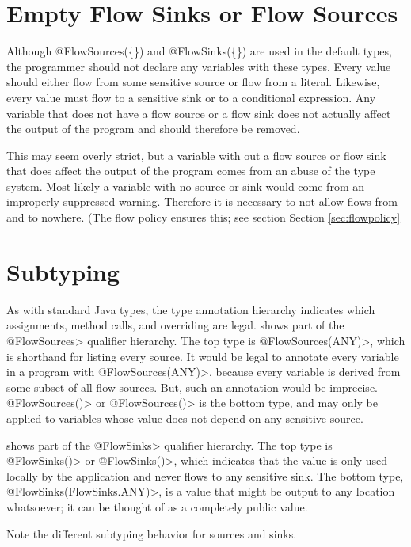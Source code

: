 \section{Empty Flow Sinks or Flow Sources}

Although @FlowSources(\{\}) and @FlowSinks(\{\}) are used in the default types, 
 the programmer should not declare any variables with these types.  Every value 
 should either flow from some sensitive source or flow from a literal.  Likewise, every value
 must flow to a sensitive sink or to a conditional expression.  Any variable that does not
 have a flow source or a flow sink  does not actually affect the
  output of the program and should therefore be removed.  
  
  This may seem overly strict, but a variable with out a flow source or flow sink that does affect
  the output of the program comes from an abuse of the type system.   Most likely  a variable with
   no source or sink would come from  an improperly suppressed warning. Therefore it is necessary to 
  not allow  flows from and to nowhere.  (The flow policy ensures this; see section Section \ref{sec:flowpolicy}


\section{Subtyping}


As with standard Java types, the type annotation hierarchy indicates which
assignments, method calls, and overriding are legal.  
shows part of the \<@FlowSources>
qualifier hierarchy.  The top type is \<@FlowSources(ANY)>, which is
shorthand for listing every source.  It would be legal to annotate every
variable in a program with \<@FlowSources(ANY)>, because every variable is
derived from some subset of all flow sources.  But, such an annotation
would be imprecise.  \<@FlowSources(\ttcbs)> or \<@FlowSources()> is the
bottom type, and may only
be applied to variables whose value does not depend on any sensitive
source.


 shows part of the \<@FlowSinks>
qualifier hierarchy.  The top type is \<@FlowSinks(\ttcbs)> or
\<@FlowSinks()>, which indicates
that the value is only used locally by the application and never flows to
any sensitive sink.  The bottom type, \<@FlowSinks(FlowSinks.ANY)>, is a
value that might be output to any location whatsoever; it can be thought of
as a completely public value.

Note the different subtyping behavior for sources and sinks.

